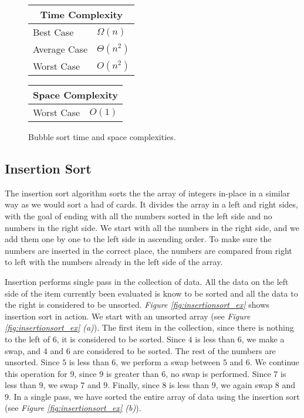 \begin{figure}[!ht]
    \centering
    \begin{tabular}{l|l}
    \multicolumn{2}{c}{\textbf{Time Complexity}} \\
    \hline
    Best Case    & $\Omega(n)$ \\
    Average Case & $\Theta(n^2)$ \\
    Worst Case   & $O(n^2)$ \\
    \end{tabular}
    \quad\quad
    \begin{tabular}{l|l}
    \multicolumn{2}{c}{\textbf{Space Complexity}} \\
    \hline
    Worst Case   & $O(1)$
    \end{tabular}
    
    \caption{Bubble sort time\cite{kazim2017} and space complexities\cite{big-o}.}
    \label{fig:bubblesort}
\end{figure}

\subsection{Insertion Sort}

The insertion sort algorithm sorts the the array of integers in-place in a similar way as we would sort a had of cards. It divides the array in a left and right sides, with the goal of ending with all the numbers sorted in the left side and no numbers in the right side. We start with all the numbers in the right side, and we add them one by one to the left side in ascending order. To make sure the numbers are inserted in the correct place, the numbers are compared from right to left with the numbers already in the left side of the array\cite{clrs2009}.

Insertion performs single pass in the collection of data. All the data on the left side of the item currently been evaluated is know to be sorted and all the data to the right is considered to be unsorted. \textit{Figure \ref{fig:insertionsort_ex}} shows insertion sort in action. We start with an unsorted array (see \textit{Figure \ref{fig:insertionsort_ex} (a)}). The first item in the collection, since there is nothing to the left of $6$, it is considered to be sorted. Since $4$ is less than $6$, we make a swap, and $4$ and $6$ are considered to be sorted. The rest of the numbers are unsorted. Since $5$ is less than $6$, we perform a swap between $5$ and $6$. We continue this operation for $9$, since $9$ is greater than $6$, no swap is performed. Since $7$ is less than $9$, we swap $7$ and $9$. Finally, since $8$ is less than $9$, we again swap $8$ and $9$. In a single pass, we have sorted the entire array of data using the insertion sort (see \textit{Figure \ref{fig:insertionsort_ex} (b)}).

